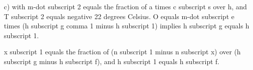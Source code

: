 c) with m-dot subscript 2 equals the fraction of a times c subscript s over h, and T subscript 2 equals negative 22 degrees Celsius. O equals m-dot subscript e times (h subscript g comma 1 minus h subscript 1) implies h subscript g equals h subscript 1.

x subscript 1 equals the fraction of (n subscript 1 minus n subscript x) over (h subscript g minus h subscript f), and h subscript 1 equals h subscript f.